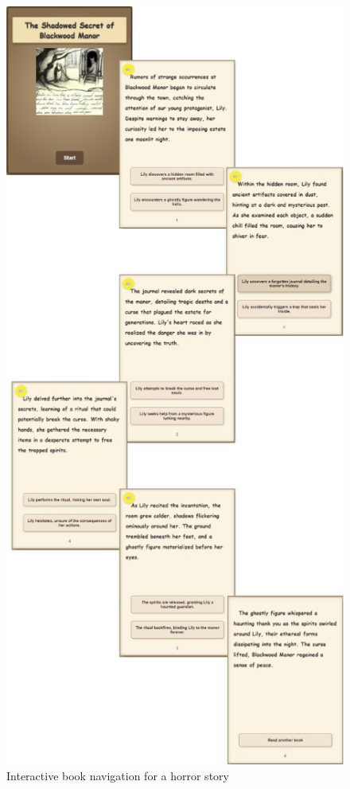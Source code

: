 \documentclass[conference]{IEEEtran}
\begin{document}
	
	\begin{figure}[H]
		\centering
		\includegraphics[width=0.5\linewidth]{img/img-ari3333-project-report-story-horror}
		\caption{Interactive book navigation for a horror story}
		\label{fig:img-ari3333-project-report-story-horror}
	\end{figure}
	
\end{document}
